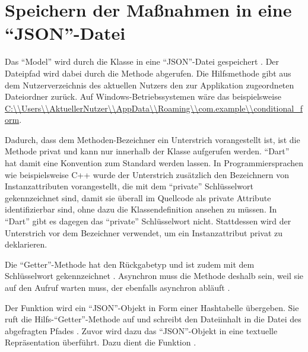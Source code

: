 
\ifodd\value{page}\hbox{}\newpage\fi
\section{Speichern der Maßnahmen in eine \enquote{JSON}-Datei}
Das \enquote{Model} wird durch die Klasse  in eine \enquote{JSON}-Datei gespeichert \Lst{\ref{lst:Schritt1KlasseMassnahmenJsonFile}}.
Der Dateipfad wird dabei durch die Methode   abgerufen.
Die Hilfsmethode   gibt aus dem Nutzerverzeichnis des aktuellen Nutzers den zur Applikation zugeordneten Dateiordner zurück.
Auf Windows-Betriebssystemen wäre das beispielsweise \url{C:\\Users\\AktuellerNutzer\\AppData\\Roaming\\com.example\\conditional_form}.

Dadurch, dass dem Methoden-Bezeichner  ein Unterstrich vorangestellt ist, ist die Methode privat und kann nur innerhalb der Klasse aufgerufen werden.
\enquote{Dart} hat damit eine Konvention zum Standard werden lassen.
In Programmiersprachen wie beispielsweise C++ wurde der Unterstrich zusätzlich den Bezeichnern von Instanzattributen vorangestellt,
die mit dem \enquote{private} Schlüsselwort gekennzeichnet sind,
damit sie überall im Quellcode als private Attribute identifizierbar sind, ohne dazu die Klassendefinition ansehen zu müssen.
In \enquote{Dart} gibt es dagegen das \enquote{private} Schlüsselwort nicht.
Stattdessen wird der Unterstrich vor dem Bezeichner verwendet, um ein Instanzattribut privat zu deklarieren.

Die \enquote{Getter}-Methode  hat den Rückgabetyp 
und ist zudem mit dem Schlüsselwort  gekennzeichnet .
Asynchron muss die Methode deshalb sein, weil sie auf den Aufruf  warten muss,
der ebenfalls asynchron abläuft .

Der Funktion   wird ein \enquote{JSON}-Objekt in Form einer Hashtabelle übergeben.
Sie ruft die Hilfs-\enquote{Getter}-Methode   auf und schreibt den Dateiinhalt in die Datei des abgefragten Pfades .
Zuvor wird dazu das \enquote{JSON}-Objekt in eine textuelle Repräsentation überführt.
Dazu dient die Funktion .


